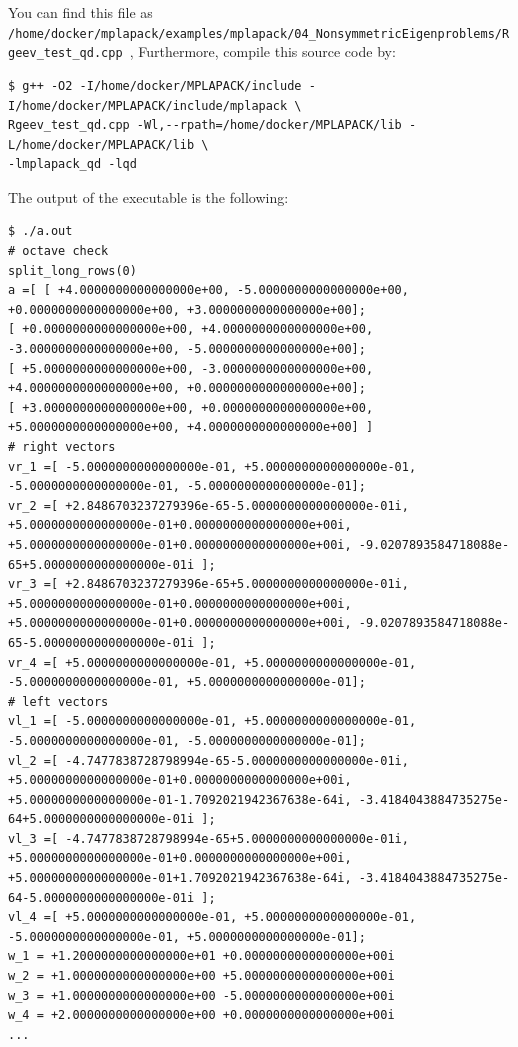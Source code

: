 \documentclass[12pt]{article}
\begin{document}
You can find this file as \\ {\tt /home/docker/mplapack/examples/mplapack/04\_NonsymmetricEigenproblems/Rgeev\_test\_qd.cpp },
Furthermore, compile this source code by:
\begin{verbatim}
$ g++ -O2 -I/home/docker/MPLAPACK/include -I/home/docker/MPLAPACK/include/mplapack \
Rgeev_test_qd.cpp -Wl,--rpath=/home/docker/MPLAPACK/lib -L/home/docker/MPLAPACK/lib \
-lmplapack_qd -lqd
\end{verbatim}
The output of the executable is the following:
{\footnotesize
\begin{verbatim}
$ ./a.out
# octave check
split_long_rows(0)
a =[ [ +4.0000000000000000e+00, -5.0000000000000000e+00, +0.0000000000000000e+00, +3.0000000000000000e+00];
[ +0.0000000000000000e+00, +4.0000000000000000e+00, -3.0000000000000000e+00, -5.0000000000000000e+00];
[ +5.0000000000000000e+00, -3.0000000000000000e+00, +4.0000000000000000e+00, +0.0000000000000000e+00];
[ +3.0000000000000000e+00, +0.0000000000000000e+00, +5.0000000000000000e+00, +4.0000000000000000e+00] ]
# right vectors
vr_1 =[ -5.0000000000000000e-01, +5.0000000000000000e-01, -5.0000000000000000e-01, -5.0000000000000000e-01];
vr_2 =[ +2.8486703237279396e-65-5.0000000000000000e-01i, +5.0000000000000000e-01+0.0000000000000000e+00i,
+5.0000000000000000e-01+0.0000000000000000e+00i, -9.0207893584718088e-65+5.0000000000000000e-01i ];
vr_3 =[ +2.8486703237279396e-65+5.0000000000000000e-01i, +5.0000000000000000e-01+0.0000000000000000e+00i,
+5.0000000000000000e-01+0.0000000000000000e+00i, -9.0207893584718088e-65-5.0000000000000000e-01i ];
vr_4 =[ +5.0000000000000000e-01, +5.0000000000000000e-01, -5.0000000000000000e-01, +5.0000000000000000e-01];
# left vectors
vl_1 =[ -5.0000000000000000e-01, +5.0000000000000000e-01, -5.0000000000000000e-01, -5.0000000000000000e-01];
vl_2 =[ -4.7477838728798994e-65-5.0000000000000000e-01i, +5.0000000000000000e-01+0.0000000000000000e+00i,
+5.0000000000000000e-01-1.7092021942367638e-64i, -3.4184043884735275e-64+5.0000000000000000e-01i ];
vl_3 =[ -4.7477838728798994e-65+5.0000000000000000e-01i, +5.0000000000000000e-01+0.0000000000000000e+00i,
+5.0000000000000000e-01+1.7092021942367638e-64i, -3.4184043884735275e-64-5.0000000000000000e-01i ];
vl_4 =[ +5.0000000000000000e-01, +5.0000000000000000e-01, -5.0000000000000000e-01, +5.0000000000000000e-01];
w_1 = +1.2000000000000000e+01 +0.0000000000000000e+00i
w_2 = +1.0000000000000000e+00 +5.0000000000000000e+00i
w_3 = +1.0000000000000000e+00 -5.0000000000000000e+00i
w_4 = +2.0000000000000000e+00 +0.0000000000000000e+00i
...
\end{verbatim}
}
\end{document}
